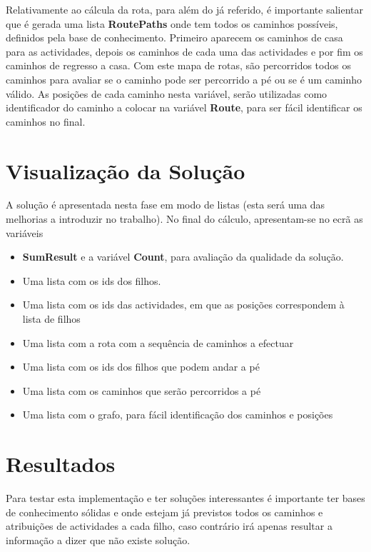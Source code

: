\documentclass[runningheads]{llncs}
\begin{document}
Relativamente ao cálcula da rota, para além do já referido, é importante salientar que é gerada uma lista \textbf{RoutePaths} onde tem todos os caminhos possíveis, definidos pela base de conhecimento. Primeiro aparecem os caminhos de casa para as actividades, depois os caminhos de cada uma das actividades e por fim os caminhos de regresso a casa. Com este mapa de rotas, são percorridos todos os caminhos para avaliar se o caminho pode ser percorrido a pé ou se é um caminho válido. As posições de cada caminho nesta variável, serão utilizadas como identificador do caminho a colocar na variável \textbf{Route}, para ser fácil identificar os caminhos no final.

\section{Visualização da Solução}\label{visualizacao}

A solução é apresentada nesta fase em modo de listas (esta será uma das melhorias a introduzir no trabalho). No final do cálculo, apresentam-se no ecrã as variáveis 
\begin{itemize}
	\item \textbf{SumResult} e a variável \textbf{Count}, para avaliação da qualidade da solução. 
	\item Uma lista com os ids dos filhos.
	\item Uma lista com os ids das actividades, em que as posições correspondem à lista de filhos
	\item Uma lista com a rota com a sequência de caminhos a efectuar
	\item Uma lista com os ids dos filhos que podem andar a pé
	\item Uma lista com os caminhos que serão percorridos a pé
	\item Uma lista com o grafo, para fácil identificação dos caminhos e posições
\end{itemize}

\section{Resultados}\label{resultados}

Para testar esta implementação e ter soluções interessantes é importante ter bases de conhecimento sólidas e onde estejam já previstos todos os caminhos e atribuições de actividades a cada filho, caso contrário irá apenas resultar a informação a dizer que não existe solução.
\end{document}
